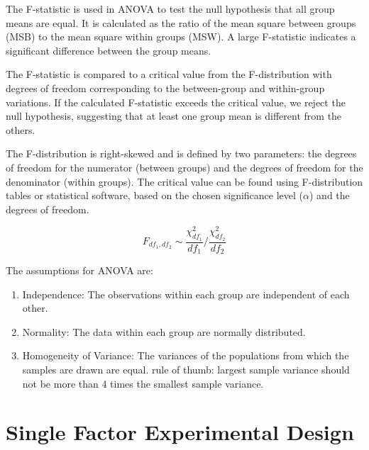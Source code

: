 \documentclass[answers,12pt,addpoints]{exam}
\begin{document}
\begin{remark}
    [F-Statistic]
    The F-statistic is used in ANOVA to test the null hypothesis that all group means are equal. It is calculated as the ratio of the mean square between groups (MSB) to the mean square within groups (MSW). A large F-statistic indicates a significant difference between the group means.

    The F-statistic is compared to a critical value from the F-distribution with degrees of freedom corresponding to the between-group and within-group variations. If the calculated F-statistic exceeds the critical value, we reject the null hypothesis, suggesting that at least one group mean is different from the others.

    The F-distribution is right-skewed and is defined by two parameters: the degrees of freedom for the numerator (between groups) and the degrees of freedom for the denominator (within groups). The critical value can be found using F-distribution tables or statistical software, based on the chosen significance level ($\alpha$) and the degrees of freedom.

    $$ F_{df_1, df_2} \sim \frac{\chi^2_{df_1}}{df_1} \Big/ \frac{\chi^2_{df_2}}{df_2} $$
\end{remark}

\begin{remark}
    The assumptions for ANOVA are:
    \begin{enumerate}
        \item Independence: The observations within each group are independent of each other.
        \item Normality: The data within each group are normally distributed.
        \item Homogeneity of Variance: The variances of the populations from which the samples are drawn are equal. rule of thumb: largest sample variance should not be more than 4 times the smallest sample variance.
    \end{enumerate}
\end{remark}

\section{Single Factor Experimental Design}
\end{document}
